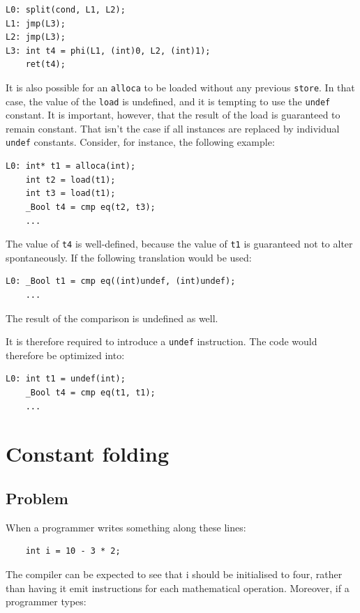 \documentclass[12pt, a4paper]{article}
\begin{document}
\begin{lstlisting}
L0:	split(cond, L1, L2);
L1:	jmp(L3);
L2:	jmp(L3);
L3:	int t4 = phi(L1, (int)0, L2, (int)1);
	ret(t4);
\end{lstlisting}

It is also possible for an \verb+alloca+ to be loaded without any previous 
\verb+store+. In that case, the value of the \verb+load+ is undefined, and it is 
tempting to use the \verb+undef+ constant. It is important, however, that the 
result of the load is guaranteed to remain constant. That isn't the case if all 
instances are replaced by individual \verb+undef+ constants. Consider, for 
instance, the following example:

\begin{lstlisting}
L0:	int* t1 = alloca(int);
	int t2 = load(t1);
	int t3 = load(t1);
	_Bool t4 = cmp eq(t2, t3);
	...
\end{lstlisting}

The value of \verb+t4+ is well-defined, because the value of \verb+t1+ is
guaranteed not to alter spontaneously. If the following translation would be 
used:

\begin{lstlisting}
L0:	_Bool t1 = cmp eq((int)undef, (int)undef);
	...
\end{lstlisting}

The result of the comparison is undefined as well.

It is therefore required to introduce a \verb+undef+ instruction. The code would 
therefore be
optimized into:

\begin{lstlisting}
L0:	int t1 = undef(int);
	_Bool t4 = cmp eq(t1, t1);
	...
\end{lstlisting}


\section{Constant folding}
\subsection{Problem}
When a programmer writes something along these lines:

\begin{lstlisting}
	int i = 10 - 3 * 2;
\end{lstlisting}

The compiler can be expected to see that i should be initialised to four, rather 
than having it emit instructions for each mathematical operation. Moreover, if a 
programmer types:
\end{document}
